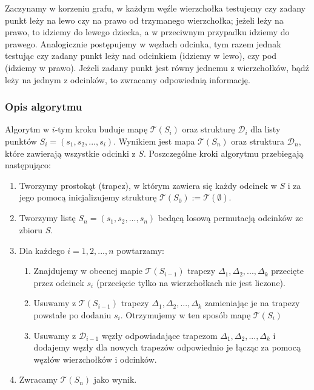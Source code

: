 \documentclass[11pt,a4paper]{article}
\begin{document}
Zaczynamy w korzeniu grafu, w każdym węźle wierzchołka 
testujemy czy zadany punkt leży na lewo czy na prawo od 
trzymanego wierzchołka; jeżeli leży na prawo, to idziemy
do lewego dziecka, a w przeciwnym przypadku idziemy do prawego.
Analogicznie postępujemy w węzłach odcinka, tym razem jednak
testując czy zadany punkt leży nad odcinkiem (idziemy w lewo),
czy pod (idziemy w prawo). Jeżeli zadany punkt jest równy
jednemu z wierzchołków, bądź leży na jednym z odcinków, to
zwracamy odpowiednią informację.

\subsubsection{Opis algorytmu}
Algorytm w $i$-tym kroku buduje mapę $\mathscr{T}(S_i)$
oraz strukturę $\mathscr{D}_i$ dla listy punktów 
$S_i = (s_1, s_2, ..., s_i)$. Wynikiem jest mapa 
$\mathscr{T}(S_n)$ oraz struktura $\mathscr{D}_n$,
które zawierają wszystkie odcinki z $S$.
Poszczególne kroki algorytmu przebiegają następująco:
\begin{enumerate}
    \item Tworzymy prostokąt (trapez), w którym zawiera się
    każdy odcinek w $S$ i za jego pomocą inicjalizujemy
    strukturę $\mathscr{T}(S_0) := \mathscr{T}(\emptyset)$.
    \item Tworzymy listę $S_n = (s_1, s_2, ..., s_n)$ bedącą
    losową permutacją odcinków ze zbioru $S$.
    \item Dla każdego $i = 1, 2, ..., n$ powtarzamy:
    \begin{enumerate}
        \item Znajdujemy w obecnej mapie $\mathscr{T}(S_{i - 1})$
        trapezy $\Delta_1, \Delta_2, ..., \Delta_k$ przecięte
        przez odcinek $s_i$ (przecięcie tylko na wierzchołkach
        nie jest liczone).
        \item Usuwamy z $\mathscr{T}(S_{i - 1})$ trapezy
        $\Delta_1, \Delta_2, ..., \Delta_k$ zamieniając je
        na trapezy powstałe po dodaniu $s_i$. Otrzymujemy
        w ten sposób mapę $\mathscr{T}(S_i)$
        \item Usuwamy z $\mathscr{D}_{i - 1}$ węzły odpowiadające
        trapezom $\Delta_1, \Delta_2, ..., \Delta_k$
        i dodajemy węzły dla nowych trapezów odpowiednio
        je łącząc za pomocą węzłów wierzchołków i odcinków.
    \end{enumerate}
    \item Zwracamy $\mathscr{T}(S_n)$ jako wynik.
\end{enumerate}
\end{document}
